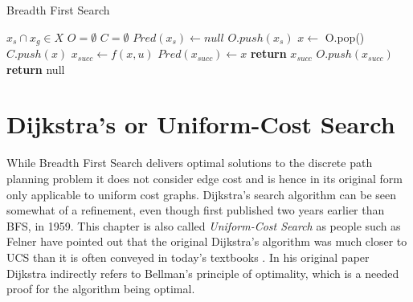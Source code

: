 \begin{algorithm}
    \caption{Breadth First Search}\label{alg:BFS}
    \begin{algorithmic}[1]
        \Require $x_s \cap x_g \in X$
        \State $O = \emptyset$
        \State $C = \emptyset$
        \State $Pred(x_s) \gets null$
        \State $O.push(x_s)$
            \State $x \gets$ O.pop()
            \State $C.push(x)$
                    \State $x_{succ} \gets f(x,u)$
                            \State $Pred(x_{succ}) \gets x$
                                \State \textbf{return} $x_{succ}$
                            \EndIf
                            \State $O.push(x_{succ})$
                        \EndIf
                    \EndIf
                \EndFor
        \EndWhile
        \State \textbf{return} null
    \end{algorithmic}
\end{algorithm}

\section{Dijkstra's or Uniform-Cost Search}
While Breadth First Search delivers optimal solutions to the discrete path planning problem it does not consider edge cost and is hence in its original form only applicable to uniform cost graphs. Dijkstra's search algorithm can be seen somewhat of a refinement, even though first published two years earlier than BFS, in 1959. This chapter is also called \emph{Uniform-Cost Search} as people such as Felner have pointed out that the original Dijkstra's algorithm was much closer to UCS than it is often conveyed in today's textbooks \cite{Felner.2011}. In his original paper Dijkstra indirectly refers to Bellman's principle of optimality, which is a needed proof for the algorithm being optimal.

